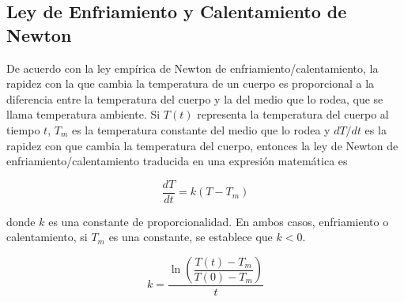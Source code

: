 \subsection{Ley de Enfriamiento y Calentamiento de Newton}

De acuerdo con la ley empírica de Newton de enfriamiento/calentamiento, la rapidez con la que cambia la temperatura de un cuerpo es proporcional
a la diferencia entre la temperatura del cuerpo y la del medio que lo rodea, que se llama temperatura ambiente. Si $T(t)$ representa la 
temperatura del cuerpo al tiempo $t$, $T_m$ es la temperatura constante del medio que lo rodea y $dT/dt$ es la rapidez con que cambia la 
temperatura del cuerpo, entonces la ley de Newton de enfriamiento/calentamiento traducida en una expresión matemática es 

\begin{equation}
	\dfrac{dT}{dt} = k(T-T_m)
	\label{eq:leyEnfCalNewton}
\end{equation}

donde $k$ es una constante de proporcionalidad. En ambos casos, enfriamiento o calentamiento, si $T_m$ es una constante, se establece que $k<0$.

\begin{equation}
	k = \frac{\ln \left( \dfrac{T(t)-T_m}{T(0)-T_m} \right)}{t}
	\label{eq:constanteLECNewton}
\end{equation}

